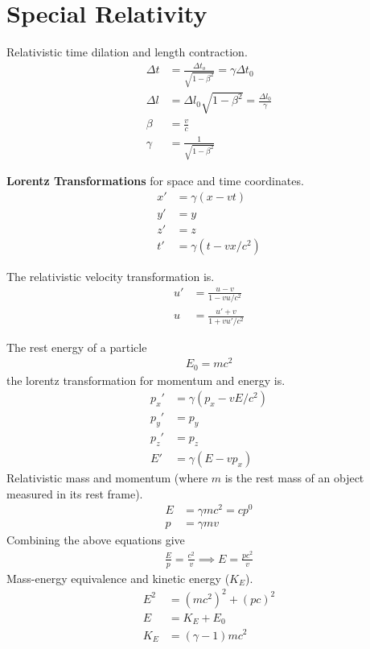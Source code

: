 \chapter{Special Relativity}
\thispagestyle{fancy}
\begin{multicols}{2}
Relativistic time dilation and length contraction.
\begin{align}
\Delta t &= \frac{\Delta t_o}{\sqrt{1-\beta^2}} = \gamma \Delta t_0 \\
\Delta l &= \Delta l_0 \sqrt{1 - \beta^2} = \frac{\Delta l_0}{\gamma} \\
\beta &= \frac{v}{c} \\
\gamma &= \frac{1}{\sqrt{1-\beta^2}}
\end{align}

\textbf{Lorentz Transformations} for space and time coordinates.
\begin{align}
x'&= \gamma(x-vt) \\
y'&=y \\
z' &= z \\
t'&= \gamma (t-vx/c^2)
\end{align}

The relativistic velocity transformation is.
\begin{align}
u' &= \frac{u-v}{1-vu/c^2} \\
u &= \frac{u'+v}{1+vu'/c^2}
\end{align}

The rest energy of a particle
\begin{align}
E_0=mc^2
\end{align}
the lorentz transformation for momentum and energy is.
\begin{align}
p_x' &= \gamma(p_x-vE/c^2) \\
p_y' &= p_y \\
p_z' &= p_z \\
E' &= \gamma(E-vp_x)
\end{align}
Relativistic mass and momentum (where $m$ is the rest mass of an object measured in its rest frame).
\begin{align}
E &=\gamma mc^2 = c p^0 \\
p &= \gamma mv
\end{align}
Combining the above equations give 
\begin{align}
\frac{E}{p} = \frac{c^2}{v} \implies E=\frac{pc^2}{v}
\end{align}
Mass-energy equivalence and kinetic energy ($K_E$).
\begin{align}
E^2 &=(mc^2)^2 + (pc)^2 \\
E &= K_E + E_0 \\
K_E &= (\gamma - 1)mc^2 
\end{align}


\end{multicols}
